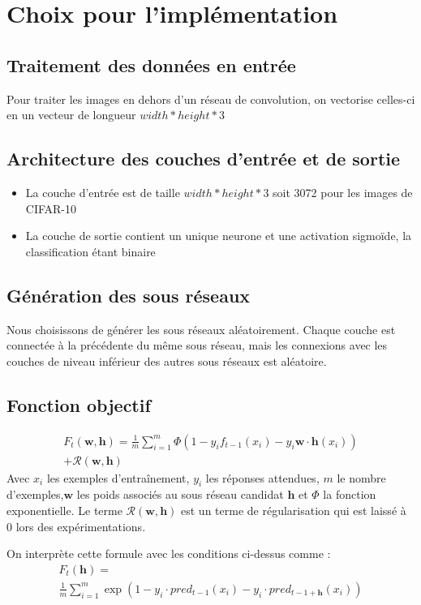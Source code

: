 \documentclass[11 pt]{article}
\begin{document}
\section{Choix pour l'implémentation}
\subsection{Traitement des données en entrée}
Pour traiter les images en dehors d'un réseau de convolution, on vectorise celles-ci en un vecteur de longueur $width*height*3$

\subsection{Architecture des couches d'entrée et de sortie}
\begin{itemize}
	\item La couche d'entrée est de taille $width*height*3$ soit 3072 pour les images de CIFAR-10
	\item La couche de sortie contient un unique neurone et une activation sigmoïde, la classification étant binaire
\end{itemize}

\subsection{Génération des sous réseaux}
Nous choisissons de générer les sous réseaux aléatoirement. Chaque couche est connectée à la précédente du même sous réseau, mais les connexions avec les couches de niveau inférieur des autres sous réseaux est aléatoire.

\subsection{Fonction objectif}
\label{subsec:fobj}
\begin{multline*}
F_t(\mathbf{w,h})=\frac{1}{m}\sum^m_{i=1}\Phi(1-y_if_{t-1}(x_i)-y_i\mathbf{w\cdot h}(x_i))\\
+ \mathcal{R}(\mathbf{w,h})
\end{multline*}
Avec $x_i$ les exemples d'entraînement, $y_i$ les réponses attendues, $m$ le nombre d'exemples,$\mathbf{w}$ les poids associés au sous réseau candidat $\mathbf{h}$ et $\Phi$ la fonction exponentielle. Le terme $\mathcal{R}(\mathbf{w,h})$ est un terme de régularisation qui est laiss\'e à $0$ lors des expérimentations.

\bigskip

On interprète cette formule avec les conditions ci-dessus comme :
\begin{multline*}
F_t(\mathbf{h})=\\
\frac{1}{m}\sum^m_{i=1}\exp(1-y_i \cdot pred_{t-1}(x_i)-y_i \cdot pred_{t-1 + \mathbf{h}}(x_i))
\end{multline*}
\end{document}

